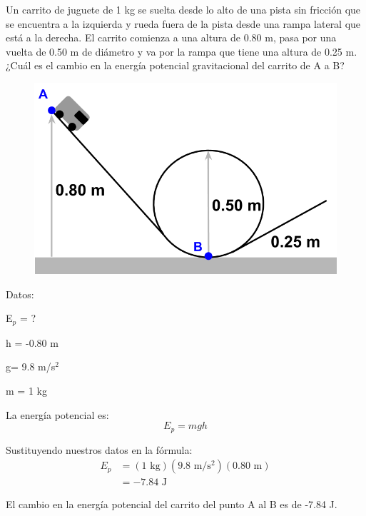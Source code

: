 \question[10] Un carrito de juguete de 1 kg se suelta desde lo alto de una pista sin fricción que se encuentra a la izquierda y rueda fuera de la pista desde una rampa lateral que está a la derecha. El carrito comienza a una altura de 0.80 m, pasa por una vuelta de 0.50 m de diámetro y va por la rampa que tiene una altura de 0.25 m. ¿Cuál es el cambio en la energía potencial gravitacional del carrito de A a B?

\begin{minipage}{0.25\textwidth}
    \begin{figure}[H]
        \includegraphics[width=\linewidth]{../images/3bea8730ba0fcd65f1afe168f731639595d83c74.png}
    \end{figure}
\end{minipage}\hfill
\begin{minipage}{0.68\textwidth}
    \begin{solutionbox}{5.2cm}
        \begin{multicols}{2}
            Datos:

            E$_p$ = ?

            h = -0.80 m

            g= 9.8 m/s$^2$

            m = 1 kg

            La energía potencial es:
            \[E_p=mgh\]

            \vspace{1.5cm}

            Sustituyendo nuestros datos en la fórmula:
            \[
                \begin{array}{rl}
                    E_p & = (1 \text{ kg})(9.8 \text{ m/s$^2$})(0.80 \text{ m}) \\[1em]
                        & =-7.84 \text{ J }
                \end{array}
            \]
        \end{multicols}
        \begin{center}El cambio en la energía potencial del carrito del punto A al B es de -7.84 J.\end{center}
    \end{solutionbox}
\end{minipage}